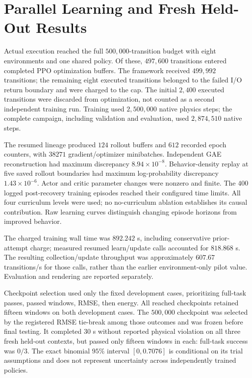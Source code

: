 \section{Parallel Learning and Fresh Held-Out Results}
Actual execution reached the full $500,000$-transition budget with eight environments and one shared policy. Of these, $497,600$ transitions entered completed PPO optimization buffers. The framework received $499,992$ transitions; the remaining eight executed transitions belonged to the failed I/O return boundary and were charged to the cap. The initial $2,400$ executed transitions were discarded from optimization, not counted as a second independent training run. Training used $2,500,000$ native physics steps; the complete campaign, including validation and evaluation, used $2,874,510$ native steps.

The resumed lineage produced $124$ rollout buffers and $612$ recorded epoch counters, with $38271$ gradient/optimizer minibatches. Independent GAE reconstruction had maximum discrepancy $8.94\times10^{-8}$. Behavior-density replay at five saved rollout boundaries had maximum log-probability discrepancy $1.43\times10^{-6}$. Actor and critic parameter changes were nonzero and finite. The $400$ logged post-recovery training episodes reached their configured time limits. All four curriculum levels were used; no no-curriculum ablation establishes its causal contribution. Raw learning curves distinguish changing episode horizons from improved behavior.

The charged training wall time was $892.242$ s, including conservative prior-attempt charge; measured resumed learn/update calls accounted for $818.868$ s. The resulting collection/update throughput was approximately $607.67$ transitions/s for those calls, rather than the earlier environment-only pilot value. Evaluation and rendering are reported separately.

Checkpoint selection used only the fixed development cases, prioritizing full-task passes, passed windows, RMSE, then energy. All reached checkpoints retained fifteen windows on both development cases. The $500,000$ checkpoint was selected by the registered RMSE tie-break among those outcomes and was frozen before final testing. It completed $30$ s without reported physical violation on all three fresh held-out contexts, but passed only fifteen windows in each: full-task success was $0/3$. The exact binomial $95\%$ interval $[0,0.7076]$ is conditional on its trial assumptions and does not represent uncertainty across independently trained policies.


